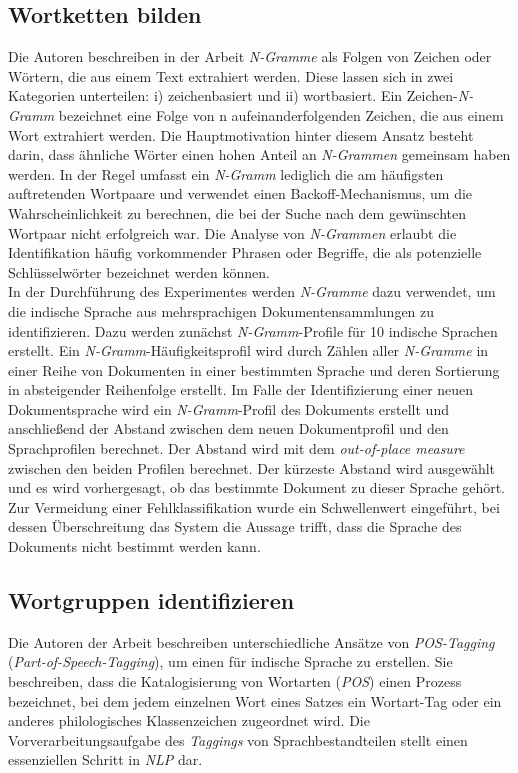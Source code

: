 \subsection*{Wortketten bilden}
Die Autoren \citeauthor{majumder2002n} beschreiben in der Arbeit \cite{majumder2002n} \emph{N-Gramme} als Folgen von Zeichen oder Wörtern, die aus einem Text extrahiert werden. Diese lassen sich in zwei Kategorien unterteilen: i) zeichenbasiert und ii) wortbasiert. Ein Zeichen-\emph{N-Gramm} bezeichnet eine Folge von n aufeinanderfolgenden Zeichen, die aus einem Wort extrahiert werden. Die Hauptmotivation hinter diesem Ansatz besteht darin, dass ähnliche Wörter einen hohen Anteil an \emph{N-Grammen} gemeinsam haben werden. In der Regel umfasst ein \emph{N-Gramm} lediglich die am häufigsten auftretenden Wortpaare und verwendet einen Backoff-Mechanismus, um die Wahrscheinlichkeit zu berechnen, die bei der Suche nach dem gewünschten Wortpaar nicht erfolgreich war. Die Analyse von \emph{N-Grammen} erlaubt die Identifikation häufig vorkommender Phrasen oder Begriffe, die als potenzielle Schlüsselwörter bezeichnet werden können.\\
In der Durchführung des Experimentes werden \emph{N-Gramme} dazu verwendet, um die indische Sprache aus mehrsprachigen Dokumentensammlungen zu identifizieren. Dazu werden zunächst \emph{N-Gramm}-Profile für 10 indische Sprachen erstellt. Ein \emph{N-Gramm}-Häufigkeitsprofil wird durch Zählen aller \emph{N-Gramme} in einer Reihe von Dokumenten in einer bestimmten Sprache und deren Sortierung in absteigender Reihenfolge erstellt. Im Falle der Identifizierung einer neuen Dokumentsprache wird ein \emph{N-Gramm}-Profil des Dokuments erstellt und anschließend der Abstand zwischen dem neuen Dokumentprofil und den Sprachprofilen berechnet. Der Abstand wird mit dem \emph{out-of-place measure} zwischen den beiden Profilen berechnet. Der kürzeste Abstand wird ausgewählt und es wird vorhergesagt, ob das bestimmte Dokument zu dieser Sprache gehört. Zur Vermeidung einer Fehlklassifikation wurde ein Schwellenwert eingeführt, bei dessen Überschreitung das System die Aussage trifft, dass die Sprache des Dokuments nicht bestimmt werden kann.
\subsection*{Wortgruppen identifizieren}
Die Autoren \citeauthor{kumawat2015pos} der Arbeit \cite{kumawat2015pos} beschreiben unterschiedliche Ansätze von \emph{POS-Tagging} (\emph{Part-of-Speech-Tagging}), um einen für indische Sprache zu erstellen. Sie beschreiben, dass die Katalogisierung von Wortarten (\emph{POS}) einen Prozess bezeichnet, bei dem jedem einzelnen Wort eines Satzes ein Wortart-Tag oder ein anderes philologisches Klassenzeichen zugeordnet wird. Die Vorverarbeitungsaufgabe des \emph{Taggings} von Sprachbestandteilen stellt einen essenziellen Schritt in \emph{NLP} dar.\\

